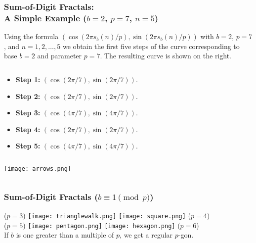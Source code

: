 \documentclass[leqno,handout]{beamer}
\begin{document}
\begin{frame} 

    
\frametitle{Sum-of-Digit Fractals:\\
A Simple Example ($b=2$, $p=7$, $n=5$)} 
{\footnotesize
Using the formula $(\cos(2\pi  s_{b}(n)/p), \sin(2\pi s_{b}(n)/p))$ with $b=2$, $p=7$, and $n=1,2,\dots,5$ we obtain  the first five steps of the curve
corresponding to base $b=2$ and parameter $p=7$. The resulting curve is shown on the right.

\begin{column}{0.48\textwidth}
\begin{itemize}

\item  \textbf{Step 1:}
$(\cos(2 \pi /7), \sin(2 \pi /7))$.
\item \textbf{Step 2:}
 $(\cos(2 \pi /7), \sin(2 \pi /7))$.


\item \textbf{Step 3:}
 $(\cos(4 \pi /7), \sin(4 \pi /7))$.

\item \textbf{Step 4:}
$(\cos(2 \pi /7), \sin(2 \pi /7))$.

\item \textbf{Step 5:}
$(\cos(4 \pi /7), \sin(4 \pi /7))$.

\end{itemize}
\end{column}
}
\begin{column}{0.5\textwidth}

\begin{center}
        \texttt{[image: arrows.png]}
               \end{center}
    \end{column}   
\end{frame} 

\begin{frame}

\frametitle{Sum-of-Digit Fractals ($b \equiv 1 \pmod{p}$)} 

\begin{center}
($p = 3$) \texttt{[image: trianglewalk.png]}
\hspace{0.2in} \texttt{[image: square.png]} ($p = 4$)\\
($p = 5$) \texttt{[image: pentagon.png]} 
\hspace{0.2in} \texttt{[image: hexagon.png]} ($p = 6$)
\\[0.1in] If $b$ is one greater than a multiple of $p$, we get a regular $p$-gon. \end{center}
    
\end{frame}
\end{document}
